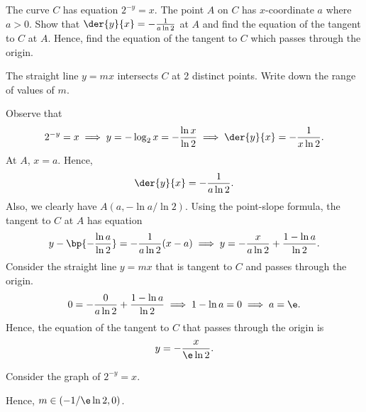 \begin{problem}
    The curve $C$ has equation $2^{-y} = x$. The point $A$ on $C$ has $x$-coordinate $a$ where $a > 0$. Show that $\der{y}{x} = -\frac1{a\ln2}$ at $A$ and find the equation of the tangent to $C$ at $A$. Hence, find the equation of the tangent to $C$ which passes through the origin.
        
    The straight line $y = mx$ intersects $C$ at 2 distinct points. Write down the range of values of $m$.
\end{problem}
\begin{solution}
    Observe that \[2^{-y} = x \implies y = -\log_2 x = -\frac{\ln x}{\ln 2} \implies \der{y}{x} = -\frac{1}{x \ln 2}.\] At $A$, $x = a$. Hence, \[\der{y}{x} = -\frac{1}{a \ln 2}.\] Also, we clearly have $A(a, -\ln a/\ln 2)$. Using the point-slope formula, the tangent to $C$ at $A$ has equation \[y-\bp{-\frac{\ln a}{\ln 2}} = -\frac1{a\ln2}(x-a) \implies y = -\frac{x}{a \ln 2} + \frac{1 - \ln a}{\ln 2}.\] Consider the straight line $y = mx$ that is tangent to $C$ and passes through the origin. \[0 = -\frac{0}{a\ln2} + \frac{1 - \ln a}{\ln2} \implies 1-\ln a = 0 \implies a = \e.\] Hence, the equation of the tangent to $C$ that passes through the origin is \[y = -\frac{x}{\e\ln 2}.\]
    
    Consider the graph of $2^{-y} = x$.

    \begin{center}
    \end{center}

    Hence, $m \in (-1/\e \ln 2, 0)$.
\end{solution}